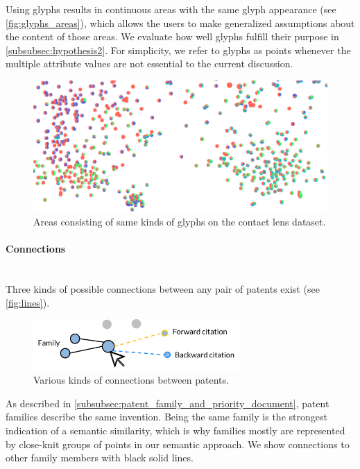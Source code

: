 Using glyphs results in continuous areas with the same glyph appearance (see \autoref{fig:glyphs_areas}), which allows the users to make generalized assumptions about the content of those areas.
We evaluate how well glyphs fulfill their purpose in \autoref{subsubsec:hypothesis2}.
For simplicity, we refer to glyphs as points whenever the multiple attribute values are not essential to the current discussion.

\begin{figure}[!]
\centering
\includegraphics[width=\textwidth]{img/glyphs_areas}
\caption{Areas consisting of same kinds of glyphs on the contact lens dataset.}
\label{fig:glyphs_areas}
\end{figure}

\paragraph{Connections}~\\
Three kinds of possible connections between any pair of patents exist (see \autoref{fig:lines}).

\begin{figure}[!]
\centering
\includegraphics[width=0.7\textwidth]{img/lines}
\caption{Various kinds of connections between patents.}
\label{fig:lines}
\end{figure}

As described in \autoref{subsubsec:patent_family_and_priority_document}, patent families describe the same invention.
Being the same family is the strongest indication of a semantic similarity, which is why families mostly are represented by close-knit groups of points in our semantic approach.
We show connections to other family members with black solid lines.


